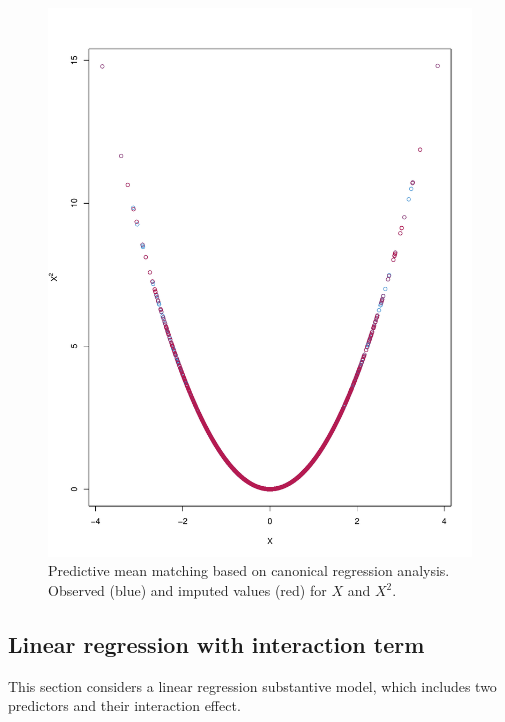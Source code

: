 		\begin{figure}[ht!]
		\centering
		\includegraphics[width=\columnwidth]{plots/plot3.1.pdf}
		\caption{Predictive mean matching based on canonical regression analysis. Observed (blue) and imputed values (red) for $X$ and $X^2$.}
		\label{fig3_1}
	\end{figure}
	
	
	\subsection{Linear regression with interaction term}
	This section considers a linear regression substantive model, which includes two predictors and their interaction effect. 
	
